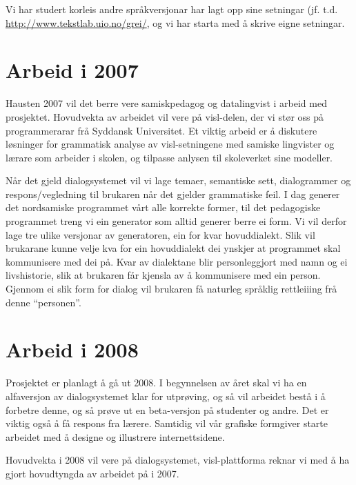 \documentclass[a4paper,norsk]{article}
\begin{document}
Vi har studert korleis andre språkversjonar har lagt opp sine setningar (jf. t.d. \url{http://www.tekstlab.uio.no/grei/}, og vi har starta med å skrive eigne setningar.

\section{Arbeid i 2007}

Hausten 2007 vil det berre vere samiskpedagog og datalingvist i arbeid med prosjektet. Hovudvekta av arbeidet vil vere på visl-delen, der vi stør oss på programmerarar frå Syddansk Universitet. Et viktig arbeid er å diskutere løsninger for grammatisk analyse av visl-setningene med samiske lingvister og lærare som arbeider i skolen, og tilpasse anlysen til skoleverket sine modeller.

Når det gjeld dialogsystemet vil vi lage temaer, semantiske sett, dialogrammer og respons/vegledning til brukaren når det gjelder grammatiske feil. I dag generer det nordsamiske programmet vårt alle korrekte former, til det pedagogiske programmet treng vi ein generator som alltid generer berre ei form. Vi vil derfor lage tre ulike versjonar av generatoren, ein for kvar hovuddialekt. Slik vil brukarane kunne velje kva for ein hovuddialekt dei ynskjer at programmet skal kommunisere med dei på. Kvar av dialektane blir personleggjort med namn og ei livshistorie, slik at brukaren får kjensla av å kommunisere med ein person. Gjennom ei slik form for dialog vil brukaren få naturleg språklig rettleiiing frå denne ``personen''. 

\section{Arbeid i 2008}

Prosjektet er planlagt å gå ut 2008. I begynnelsen av året skal vi ha en alfaversjon av dialogsystemet klar for utprøving, og så vil arbeidet bestå i å forbetre denne, og så prøve ut en beta-versjon på studenter og andre. Det er viktig også å få respons fra lærere. Samtidig vil vår grafiske formgiver starte arbeidet med å designe og illustrere internettsidene.

Hovudvekta i 2008 vil vere på dialogsystemet, visl-plattforma reknar vi med å ha gjort hovudtyngda av arbeidet på i 2007. 
\end{document}
